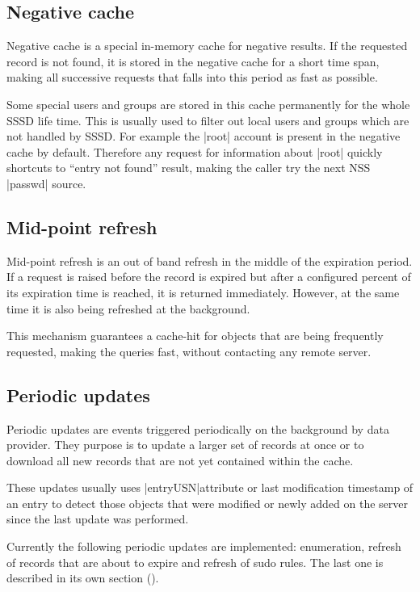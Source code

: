 \subsection{Negative cache}
\label{sssd:cache:negative}

Negative cache is a special in-memory cache for negative results. If the
requested record is not found, it is stored in the negative cache for a short
time span, making all successive requests that falls into this period as fast
as possible.

Some special users and groups are stored in this cache permanently for the whole
SSSD life time. This is usually used to filter out local users and groups which
are not handled by SSSD. For example the |root| account is present in the
negative cache by default. Therefore any request for information about |root|
quickly shortcuts to ``entry not found'' result, making the caller try the next
NSS |passwd| source.

\subsection{Mid-point refresh}
\label{sssd:cache:midpoint}

Mid-point refresh is an out of band refresh in the middle of the expiration
period. If a request is raised before the record is expired but after a
configured percent of its expiration time is reached, it is returned
immediately. However, at the same time it is also being refreshed at the
background.

This mechanism guarantees a cache-hit for objects that are being frequently
requested, making the queries fast, without contacting any remote server.

\subsection{Periodic updates}
\label{sssd:cache:periodic}

Periodic updates are events triggered periodically on the background by data
provider. They purpose is to update a larger set of records at once or to
download all new records that are not yet contained within the cache.

These updates usually uses |entryUSN|\footnotemark attribute or last modification
timestamp of an entry to detect those objects that were modified or newly added
on the server since the last update was performed.

Currently the following periodic updates are implemented: enumeration, refresh
of records that are about to expire and refresh of sudo rules. The last one is
described in its own section ().

